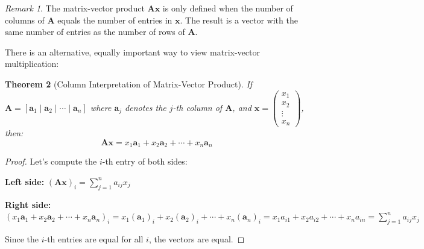 \documentclass[12pt]{article}
\numberwithin{equation}{section}
\newcommand{\vect}[1]{\boldsymbol{#1}}   %
\newcommand{\mat}[1]{\mathbf{#1}}        %
\theoremstyle{plain}
\newtheorem{theorem}{Theorem}[section]
\theoremstyle{definition}
\theoremstyle{remark}
\newtheorem{remark}[theorem]{Remark}
\begin{document}
\begin{remark}
The matrix-vector product $\mat{A}\vect{x}$ is only defined when the number of columns of $\mat{A}$ equals the number of entries in $\vect{x}$. The result is a vector with the same number of entries as the number of rows of $\mat{A}$.
\end{remark}

There is an alternative, equally important way to view matrix-vector multiplication:

\begin{theorem}[Column Interpretation of Matrix-Vector Product]
If $\mat{A} = [\vect{a}_1 \mid \vect{a}_2 \mid \cdots \mid \vect{a}_n]$ where $\vect{a}_j$ denotes the $j$-th column of $\mat{A}$, and $\vect{x} = \begin{pmatrix} x_1 \\ x_2 \\ \vdots \\ x_n \end{pmatrix}$, then:
$$\mat{A}\vect{x} = x_1\vect{a}_1 + x_2\vect{a}_2 + \cdots + x_n\vect{a}_n$$
\end{theorem}

\begin{proof}
Let's compute the $i$-th entry of both sides:

\textbf{Left side:} $(\mat{A}\vect{x})_i = \sum_{j=1}^n a_{ij}x_j$

\textbf{Right side:} $(x_1\vect{a}_1 + x_2\vect{a}_2 + \cdots + x_n\vect{a}_n)_i = x_1(\vect{a}_1)_i + x_2(\vect{a}_2)_i + \cdots + x_n(\vect{a}_n)_i = x_1a_{i1} + x_2a_{i2} + \cdots + x_na_{in} = \sum_{j=1}^n a_{ij}x_j$

Since the $i$-th entries are equal for all $i$, the vectors are equal.
\end{proof}
\end{document}
